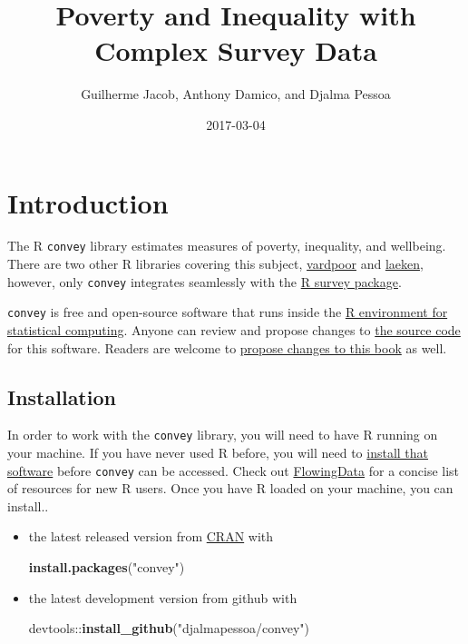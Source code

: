 \documentclass[]{book}
\title{Poverty and Inequality with Complex Survey Data}
\author{Guilherme Jacob, Anthony Damico, and Djalma Pessoa}
\date{2017-03-04}
\newenvironment{Shaded}{\begin{snugshade}}{\end{snugshade}}
\newcommand{\KeywordTok}[1]{\textcolor[rgb]{0.13,0.29,0.53}{\textbf{{#1}}}}
\newcommand{\StringTok}[1]{\textcolor[rgb]{0.31,0.60,0.02}{{#1}}}
\newcommand{\NormalTok}[1]{{#1}}
\theoremstyle{definition}
\theoremstyle{definition}
\theoremstyle{remark}
\begin{document}
\maketitle

{
\setcounter{tocdepth}{1}
\tableofcontents
}
\chapter{Introduction}\label{introduction}

The R \texttt{convey} library estimates measures of poverty, inequality,
and wellbeing. There are two other R libraries covering this subject,
\href{https://CRAN.R-project.org/package=vardpoor}{vardpoor} and
\href{https://CRAN.R-project.org/package=laeken}{laeken}, however, only
\texttt{convey} integrates seamlessly with the
\href{https://CRAN.R-project.org/package=survey}{R survey package}.

\texttt{convey} is free and open-source software that runs inside the
\href{https://www.r-project.org/}{R environment for statistical
computing}. Anyone can review and propose changes to
\href{https://github.com/DjalmaPessoa/convey}{the source code} for this
software. Readers are welcome to
\href{https://github.com/guilhermejacob/context/}{propose changes to
this book} as well.

\section{Installation}\label{install}

In order to work with the \texttt{convey} library, you will need to have
R running on your machine. If you have never used R before, you will
need to \href{https://www.r-project.org/}{install that software} before
\texttt{convey} can be accessed. Check out
\href{http://flowingdata.com/2012/06/04/resources-for-getting-started-with-r/}{FlowingData}
for a concise list of resources for new R users. Once you have R loaded
on your machine, you can install..

\begin{itemize}
\item
  the latest released version from
  \href{https://CRAN.R-project.org/package=convey}{CRAN} with

\begin{Shaded}
\begin{Highlighting}[]
\KeywordTok{install.packages}\NormalTok{(}\StringTok{"convey"}\NormalTok{)}
\end{Highlighting}
\end{Shaded}
\item
  the latest development version from github with

\begin{Shaded}
\begin{Highlighting}[]
\NormalTok{devtools::}\KeywordTok{install_github}\NormalTok{(}\StringTok{"djalmapessoa/convey"}\NormalTok{)}
\end{Highlighting}
\end{Shaded}
\end{itemize}
\end{document}
